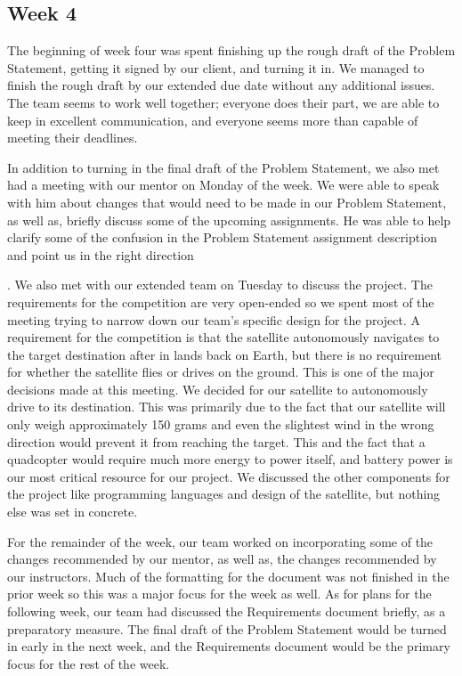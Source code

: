 \documentclass[10pt,letterpaper,onecolumn,draftclsnofoot,journal]{IEEEtran}
\begin{document}
\subsection{Week 4}
The beginning of week four was spent finishing up the rough draft of the Problem Statement, getting it signed by our client, and turning it in. We managed to finish the rough draft by our extended due date without any additional issues. The team seems to work well together; everyone does their part, we are able to keep in excellent communication, and everyone seems more than capable of meeting their deadlines.\vspace{.3cm}
\par 
In addition to turning in the final draft of the Problem Statement, we also met had a meeting with our mentor on Monday of the week. We were able to speak with him about changes that would need to be made in our Problem Statement, as well as, briefly discuss some of the upcoming assignments. He was able to help clarify some of the confusion in the Problem Statement assignment description and point us in the right direction\vspace{.3cm}
\par. 
We also met with our extended team on Tuesday to discuss the project. The requirements for the competition are very open-ended so we spent most of the meeting trying to narrow down our team's specific design for the project. A requirement for the competition is that the satellite autonomously navigates to the target destination after in lands back on Earth, but there is no requirement for whether the satellite flies or drives on the ground. This is one of the major decisions made at this meeting. We decided for our satellite to autonomously drive to its destination. This was primarily due to the fact that our satellite will only weigh approximately 150 grams and even the slightest wind in the wrong direction would prevent it from reaching the target. This and the fact that a quadcopter would require much more energy to power itself, and battery power is our most critical resource for our project. We discussed the other components for the project like programming languages and design of the satellite, but nothing else was set in concrete.\vspace{.3cm}
\par   
For the remainder of the week, our team worked on incorporating some of the changes recommended by our mentor, as well as, the changes recommended by our instructors. Much of the formatting for the document was not finished in the prior week so this was a major focus for the week as well. As for plans for the following week, our team had discussed the Requirements document briefly, as a preparatory measure. The final draft of the Problem Statement would be turned in early in the next week, and the Requirements document would be the primary focus for the rest of the week. 
\end{document}
